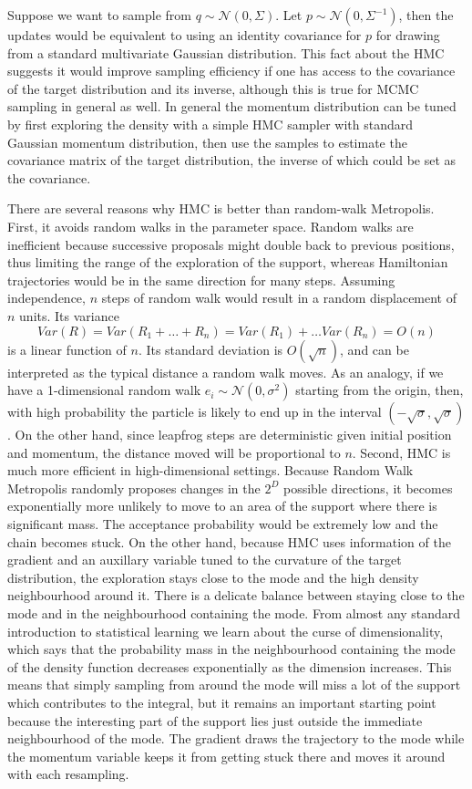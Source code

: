 \documentclass[]{report}
\begin{document}
Suppose we want to sample from $q \sim \mathcal{N}(0,\Sigma)$. Let $p \sim
\mathcal{N}(0,\Sigma^{-1})$, then the updates would be equivalent to using an
identity covariance for $p$ for drawing from a standard multivariate Gaussian
distribution. This
fact about the HMC suggests it would improve sampling efficiency if one has
access to the covariance of the target distribution and its inverse, although this is true for
MCMC sampling in general as well. 
In general the momentum distribution can be tuned by first exploring the density
with a simple HMC sampler with standard Gaussian momentum distribution, then use
the samples to estimate the covariance matrix of the target distribution, the
inverse of which could be set as the covariance. 

There are several reasons why HMC is better than random-walk Metropolis. First,
it avoids random walks in the parameter space. Random walks are inefficient because successive
proposals might double back to previous positions, thus limiting the range of
the exploration of the support, whereas Hamiltonian trajectories would be in the
same direction for many steps. Assuming independence, $n$ steps of random walk
would result in a random displacement of $n$ units. Its variance  
\[Var(R) = Var(R_1 + \dots + R_n) = Var(R_1) + \dots Var(R_n) = O(n) \]
is a linear function of $n$. Its standard deviation is $O(\sqrt{n})$, and can be
interpreted as the typical distance a random walk moves. As an analogy, if we
have a 1-dimensional random walk $e_i \sim \mathcal{N}(0,\sigma^2)$ starting from
the origin, then,  with high probability the particle is likely to end up in the
interval $(-\sqrt{\sigma},\sqrt{\sigma})$. 
On the other hand, since leapfrog steps are deterministic given initial position
and momentum, the distance moved will be proportional to $n$. 
Second, HMC is much more efficient in
high-dimensional settings. Because Random Walk Metropolis randomly proposes changes in
the $2^D$ possible directions, it becomes exponentially more unlikely to move
to an area of the support where there is significant mass. The acceptance
probability would be extremely low and the chain becomes stuck. On the other
hand, because HMC uses information of the gradient and an auxillary variable
tuned to the curvature of the target distribution, the exploration stays close
to the mode and the high density neighbourhood around it. There is a delicate
balance between staying close to the mode and in the neighbourhood containing
the mode. From almost any standard introduction to statistical learning \cite{friedman2001elements} we learn about the curse of dimensionality, which says that the probability mass in the neighbourhood containing the mode of the density function decreases exponentially as the dimension increases. This means that simply sampling from around the mode will miss a lot of the support which contributes to the integral, but it remains an important starting point because the interesting part of the support lies just outside the immediate neighbourhood of the mode. The gradient draws the
trajectory to
the mode while the momentum variable keeps it from getting stuck there and moves it around with each resampling.
\end{document}
